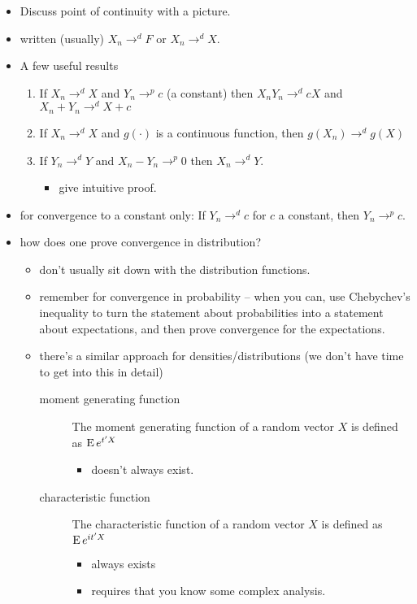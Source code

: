 \begin{itemize}
\item Discuss point of continuity with a picture.
\item written (usually) $X_n →^d F$ or $X_n →^d X$.
\item A few useful results \citep[D.16]{Gre_2011}
\begin{enumerate}
\item If $X_n →^d X$ and $Y_n →^p c$ (a constant) then
  $X_n Y_n →^d c X$ and $X_n + Y_n →^d X + c$
\item If $X_n →^d X$ and $g(·)$ is a continuous function, then
  $g(X_n) →^d g(X)$
\item If $Y_n →^d Y$ and $X_n - Y_n →^p 0$ then $X_n →^d Y$.
\begin{itemize}
\item give intuitive proof.
\end{itemize}
\end{enumerate}
\item for convergence to a constant only: If $Y_n →^d c$ for $c$ a
  constant, then $Y_n →^p c$.
\item how does one prove convergence in distribution?
\begin{itemize}
\item don't usually sit down with the distribution functions.
\item remember for convergence in probability -- when you can, use
         Chebychev's inequality to turn the statement about
         probabilities into a statement about expectations, and then
         prove convergence for the expectations.
\item there's a similar approach for densities/distributions (we
         don't have time to get into this in detail)
\begin{description}
\item[moment generating function] The moment generating function
  of a random vector $X$ is defined as $\operatorname{E} e^{t'X}$
\begin{itemize}
\item doesn't always exist.
\end{itemize}
\item[characteristic function] The characteristic function of a
  random vector $X$ is defined as $\operatorname{E} e^{it'X}$
\begin{itemize}
\item always exists
\item requires that you know some complex analysis.
\end{itemize}

\end{description}
\end{itemize}
\end{itemize}
